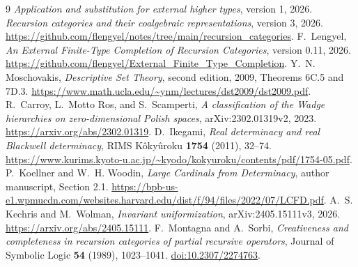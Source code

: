\documentclass[11pt]{article}
\theoremstyle{definition}
\begin{document}
\begin{thebibliography}{9}
\small
{} \emph{Application and substitution for external
higher types}, version 1, 2026.
 \emph{Recursion categories and their coalgebraic
representations}, version 3, 2026.
\url{https://github.com/flengyel/notes/tree/main/recursion_categories}.
 F.~Lengyel, \emph{An External Finite-Type Completion
of Recursion Categories}, version 0.11, 2026.
\url{https://github.com/flengyel/External_Finite_Type_Completion}.
 Y.~N. Moschovakis, \emph{Descriptive Set Theory},
second edition, 2009, Theorems 6C.5 and 7D.3.
\url{https://www.math.ucla.edu/~ynm/lectures/dst2009/dst2009.pdf}.
 R.~Carroy, L.~Motto Ros, and S.~Scamperti,
\emph{A classification of the Wadge hierarchies on zero-dimensional
Polish spaces}, arXiv:2302.01319v2, 2023.
\url{https://arxiv.org/abs/2302.01319}.
 D.~Ikegami, \emph{Real determinacy and real Blackwell
determinacy}, RIMS K\^oky\^uroku \textbf{1754} (2011), 32--74.
\url{https://www.kurims.kyoto-u.ac.jp/~kyodo/kokyuroku/contents/pdf/1754-05.pdf}.
 P.~Koellner and W.~H. Woodin,
\emph{Large Cardinals from Determinacy}, author manuscript, Section 2.1.
\url{https://bpb-us-e1.wpmucdn.com/websites.harvard.edu/dist/f/94/files/2022/07/LCFD.pdf}.
 A.~S. Kechris and M.~Wolman,
\emph{Invariant uniformization}, arXiv:2405.15111v3, 2026.
\url{https://arxiv.org/abs/2405.15111}.
 F.~Montagna and A.~Sorbi,
\emph{Creativeness and completeness in recursion categories of partial
recursive operators},
Journal of Symbolic Logic \textbf{54} (1989), 1023--1041.
\href{https://doi.org/10.2307/2274763}{doi:10.2307/2274763}.
\end{thebibliography}
\end{document}
